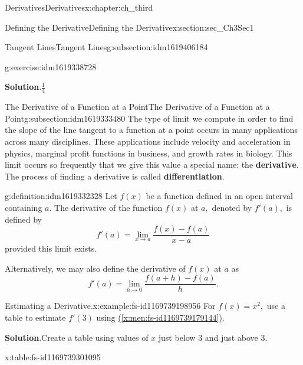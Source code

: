 \documentclass[oneside,10pt,]{book}
\newcommand{\blocktitlefont}{\relax}
\newcommand{\tabularfont}{\relax}
\newcommand{\xreffont}{\relax}
\newcommand{\terminology}[1]{\textbf{#1}}
\numberwithin{equation}{section}
\begin{document}
\begin{chapterptx}{Derivatives}{}{Derivatives}{}{}{x:chapter:ch_third}
\begin{sectionptx}{Defining the Derivative}{}{Defining the Derivative}{}{}{x:section:sec_Ch3Sec1}
\begin{subsectionptx}{Tangent Lines}{}{Tangent Lines}{}{}{g:subsection:idm1619406184}
\begin{inlineexercise}{}{g:exercise:idm1619338728}
\par\smallskip%
\noindent\textbf{\blocktitlefont Solution}.\hypertarget{g:solution:idm1619335784}{}\quad{}\(\frac{1}{4}\)%
\end{inlineexercise}%
\end{subsectionptx}
%
%
\typeout{************************************************}
\typeout{************************************************}
%
\begin{subsectionptx}{The Derivative of a Function at a Point}{}{The Derivative of a Function at a Point}{}{}{g:subsection:idm1619333480}
The type of limit we compute in order to find the slope of the line tangent to a function at a point occurs in many applications across many disciplines. These applications include velocity and acceleration in physics, marginal profit functions in business, and growth rates in biology. This limit occurs so frequently that we give this value a special name: the \terminology{derivative}. The process of finding a derivative is called \terminology{differentiation}.%
\begin{definition}{}{g:definition:idm1619332328}%
Let \(f(x)\) be a function defined in an open interval containing \(a.\) The derivative of the function \(f(x)\) at \(a,\) denoted by \(f'(a),\) is defined by%
%
\begin{equation}
f'(a)=\lim_{x\to a}\frac{f(x)-f(a)}{x-a}\label{x:men:fs-id1169739179144}
\end{equation}
provided this limit exists.%
\par
Alternatively, we may also define the derivative of \(f(x)\) at \(a\) as%
%
\begin{equation}
f'(a)=\lim_{h\to 0}\frac{f(a+h)-f(a)}{h}.\label{x:men:fs-id1169739188551}
\end{equation}
\end{definition}
\begin{example}{Estimating a Derivative.}{x:example:fs-id1169739198956}%
For \(f(x)=x^2,\) use a table to estimate \(f'(3)\) using \hyperref[x:men:fs-id1169739179144]{({\xreffont\ref{x:men:fs-id1169739179144}})}.%
\par\smallskip%
\noindent\textbf{\blocktitlefont Solution}.\hypertarget{g:solution:idm1619325160}{}\quad{}Create a table using values of \(x\) just below \(3\) and just above \(3.\)%
\begin{tableptx}{\textbf{}}{x:table:fs-id1169739301095}{}%
\centering%
{\tabularfont%
\begin{tabular}{ll}

\end{tabular}}
\end{tableptx}
\end{example}
\end{subsectionptx}
\end{sectionptx}
\end{chapterptx}
\end{document}
